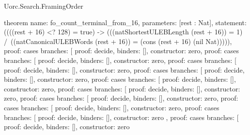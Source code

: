 \begin{lexlean}{Uorc.Search.FramingOrder}
\begin{semanticmodule}
theorem{
  name: fo_count_terminal_from_16,
  parameters: [rest : Nat],
  statement: ((((rest + 16) <? 128) = true) -> (((natShortestULEBLength (rest + 16)) = 1) /\ ((natCanonicalULEBWords (rest + 16)) = (cons (rest + 16) (nil Nat))))),
  proof: cases{
    branches: [
      {proof: decide{}, binders: [], constructor: zero},
      {
        proof: cases{
          branches: [
            {proof: decide{}, binders: [], constructor: zero},
            {
              proof: cases{
                branches: [
                  {proof: decide{}, binders: [], constructor: zero},
                  {
                    proof: cases{
                      branches: [
                        {proof: decide{}, binders: [], constructor: zero},
                        {
                          proof: cases{
                            branches: [
                              {proof: decide{}, binders: [], constructor: zero},
                              {
                                proof: cases{
                                  branches: [
                                    {proof: decide{}, binders: [], constructor: zero},
                                    {
                                      proof: cases{
                                        branches: [
                                          {proof: decide{}, binders: [], constructor: zero},
                                          {
                                            proof: cases{
                                              branches: [
                                                {proof: decide{}, binders: [], constructor: zero},
                                                {
                                                  proof: cases{
                                                    branches: [
                                                      {
                                                        proof: decide{},
                                                        binders: [],
                                                        constructor: zero
                                                      },
                                                      {
                                                        proof: cases{
                                                          branches: [
                                                            {
                                                              proof: decide{},
                                                              binders: [],
                                                              constructor: zero
}}}}}}}}}}}}}}}}}}}}}
\end{semanticmodule}
\end{lexlean}
